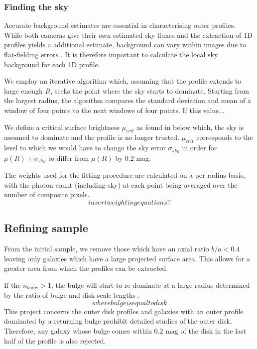 \subsubsection{Finding the sky}
Accurate background estimates are essential in characterising outer profiles. While both cameras give their own estimated sky fluxes and the extraction of 1D profiles yields a additional estimate, background can vary within images due to flat-fielding errors \citep{bijaoui_sky_1980}. It is therefore important to calculate the local sky background for each 1D profile. 

 We employ an iterative algorithm which, assuming that the profile extends to large enough $R$, seeks the point where the sky starts to dominate. Starting from the largest radius, the algorithm compares the standard deviation and mean of a window of four points to the next windows of four points. If this value...

\begin{figure}
	\label{fig: flow chart of sky finder}
\end{figure}

We define a critical surface brightness $\mu_{crit}$ as found in \citet{pohlen_structure_2006} below which, the sky is assumed to dominate and the profile is no longer trusted. $\mu_{crit}$ corresponds to the level to which we would have to change the sky error $\sigma_{sky}$ in order for $\mu(R)\pm\sigma_{sky}$ to differ from $\mu(R)$ by 0.2 mag. 

The weights used for the fitting procedure are calculated on a per radius basis, with the photon count (including sky) at each point being averaged over the number of composite pixels. 
\begin{equation}
	insert weighting equations!!
\end{equation}

\subsection{Refining sample}
From the initial sample, we remove those which have an axial ratio $b/a < 0.4$ leaving only galaxies which have a large projected surface area. This allows for a greater area from which the profiles can be extracted. 

If the $n_{bulge} > 1$, the bulge will start to re-dominate at a large radius determined by the ratio of bulge and disk scale lengths \citep{driver_millennium_2007}.
\begin{equation}
	where bulge is equal to disk
\end{equation}
 This project concerns the outer disk profiles and galaxies with an outer profile dominated by a returning bulge prohibit detailed studies of the outer disk. Therefore, any galaxy whose bulge comes within $0.2$ mag of the disk in the last half of the profile is also rejected.

